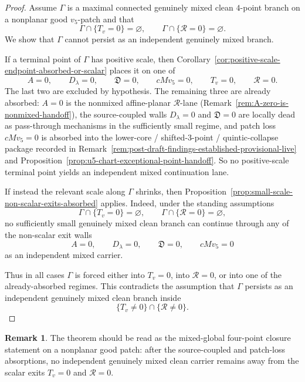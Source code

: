 \documentclass[11pt,a4paper]{amsart}
\theoremstyle{plain}
\theoremstyle{definition}
\newtheorem{remark}[theorem]{Remark}
\begin{document}
\begin{proof}
Assume $\Gamma$ is a maximal connected genuinely mixed clean $4$-point branch on
a nonplanar good $v_5$-patch and that
\[
\Gamma\cap\{T_v=0\}=\varnothing,
\qquad
\Gamma\cap\{\mathcal R=0\}=\varnothing.
\]
We show that $\Gamma$ cannot persist as an independent genuinely mixed branch.

If a terminal point of $\Gamma$ has positive scale, then
Corollary~\ref{cor:positive-scale-endpoint-absorbed-or-scalar} places it on one
of
\[
A=0,\qquad D_\lambda=0,\qquad \mathfrak D=0,\qquad cMv_5=0,\qquad
T_v=0,\qquad \mathcal R=0.
\]
The last two are excluded by hypothesis. The remaining three are already
absorbed: $A=0$ is the nonmixed affine-planar $\mathcal R$-lane
(Remark~\ref{rem:A-zero-is-nonmixed-handoff}), the source-coupled walls
$D_\lambda=0$ and $\mathfrak D=0$ are locally dead as pass-through mechanisms
in the sufficiently small regime, and patch loss $cMv_5=0$ is absorbed into the
lower-core / shifted-$3$-point / quintic-collapse package recorded in
Remark~\ref{rem:post-draft-findings-established-provisional-live} and
Proposition~\ref{prop:u5-chart-exceptional-point-handoff}. So no positive-scale
terminal point yields an independent mixed continuation lane.

If instead the relevant scale along $\Gamma$ shrinks, then
Proposition~\ref{prop:small-scale-non-scalar-exits-absorbed} applies. Indeed,
under the standing assumptions
\[
\Gamma\cap\{T_v=0\}=\varnothing,
\qquad
\Gamma\cap\{\mathcal R=0\}=\varnothing,
\]
no sufficiently small genuinely mixed clean branch can continue through any of
the non-scalar exit walls
\[
A=0,\qquad D_\lambda=0,\qquad \mathfrak D=0,\qquad cMv_5=0
\]
as an independent mixed carrier.

Thus in all cases $\Gamma$ is forced either into $T_v=0$, into $\mathcal R=0$,
or into one of the already-absorbed regimes. This contradicts the assumption
that $\Gamma$ persists as an independent genuinely mixed clean branch inside
\[
\{T_v\neq 0\}\cap\{\mathcal R\neq 0\}.
\]
\end{proof}

\begin{remark}
The theorem should be read as the mixed-global four-point closure statement on a
nonplanar good patch: after the source-coupled and patch-loss absorptions, no
independent genuinely mixed clean carrier remains away from the scalar exits
$T_v=0$ and $\mathcal R=0$.
\end{remark}
\end{document}
